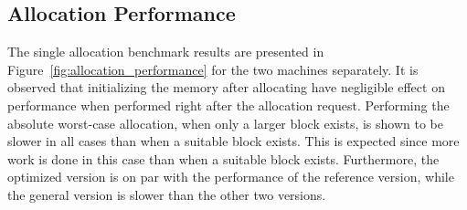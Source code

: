 
\subsection{Allocation Performance}
\label{sec:allocation-performance}

The single allocation benchmark results are presented in Figure~\ref{fig:allocation_performance} for the two machines separately. It is observed that initializing the memory after allocating have negligible effect on performance when performed right after the allocation request. Performing the absolute worst-case allocation, when only a larger block exists, is shown to be slower in all cases than when a suitable block exists. This is expected since more work is done in this case than when a suitable block exists. Furthermore, the optimized version is on par with the performance of the reference version, while the general version is slower than the other two versions. 

